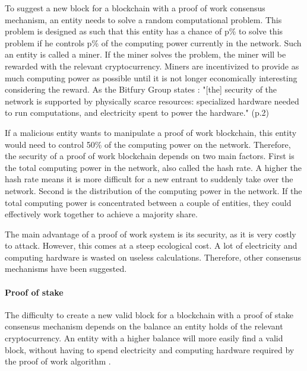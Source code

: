 \iffalse
TODO: maybe add a small part about the alternative to a mining: merged mining and anchoring (cfr bitfury - group publc vs private prt 1)
\fi

To suggest a new block for a blockchain with a proof of work consensus mechanism, an entity needs to solve a random computational problem. This problem is designed as such that this entity has a chance of p\% to solve this problem if he controls p\% of the computing power currently in the network. Such an entity is called a miner. If the miner solves the problem, the miner will be rewarded with the relevant cryptocurrency. Miners are incentivized to provide as much computing power as possible until it is not longer economically interesting considering the reward. As the Bitfury Group states \cite{bitfury-pos-vs-pow}: "[the] security of the network is supported by physically scarce resources: specialized hardware needed to run computations, and electricity spent to power the hardware." (p.2)

If a malicious entity wants to manipulate a proof of work blockchain, this entity would need to control 50\% of the computing power on the network. Therefore, the security of a proof of work blockchain depends on two main factors. First is the total computing power in the network, also called the hash rate. A higher the hash rate means it is more difficult for a new entrant to suddenly take over the network. Second is the distribution of the computing power in the network. If the total computing power  is concentrated between a couple of entities, they could effectively work together to achieve a majority share.

The main advantage of a proof of work system is its security, as it is very costly to attack. However, this comes at a steep ecological cost. A lot of electricity and computing hardware is wasted on useless calculations. Therefore, other consensus mechanisms have been suggested.

\paragraph{Proof of stake}

The difficulty to create a new valid block for a blockchain with a proof of stake consensus mechanism depends on the balance an entity holds of the relevant cryptocurrency. An entity with a higher balance will more easily find a valid block, without having to spend electricity and computing hardware required by the proof of work algorithm \cite{bitfury-pos-vs-pow}.

